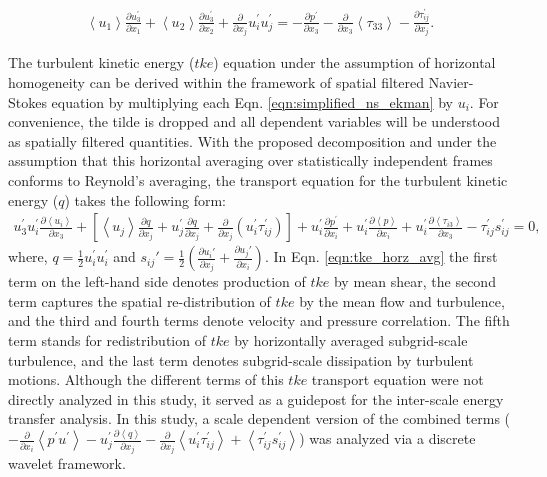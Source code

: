 \begin{align}
 \left < u_1 \right > \frac{\partial u_3^{\prime}}{\partial x_1}  + \left < u_2 \right > \frac{\partial u_3^{\prime}}{\partial x_2} +\frac{\partial }{\partial x_j} u_i^{\prime}u_j^{\prime} = -\frac{\partial p^{\prime} }{\partial x_3} -\frac{\partial }{\partial x_3} \left < \tau_{33}\right > - \frac{\partial \tau_{ij}^{\prime}}{\partial x_j}.
 \label{eqn:simplified_ns_ekman}
\end{align}

The turbulent kinetic energy ($tke$) equation under the assumption of horizontal homogeneity can be derived within the framework of spatial filtered Navier-Stokes equation by multiplying each Eqn.  \ref{eqn:simplified_ns_ekman} by $u_i$. For convenience, the tilde is dropped and all dependent variables will be understood as spatially filtered quantities. With the proposed decomposition and under the assumption that this horizontal averaging over statistically independent frames conforms to Reynold's averaging, the transport equation for the turbulent kinetic energy ($q$) takes the following form:
\begin{align}
u_3^\prime u_i^\prime \frac{\partial \left< u_i \right>}{\partial x_3}+[\left< u_j\right>\frac{\partial q}{\partial x_j}+u_j^\prime\frac{\partial q}{\partial x_j}+\frac{\partial }{\partial x_j}(u_i^\prime \tau_{ij}^\prime)]+u_i^\prime\frac{\partial p^\prime}{\partial x_i}+ u_i^\prime \frac{\partial \left < p \right >}{\partial x_i}+u_i^\prime\frac{\partial \left < \tau_{i3} \right >}{\partial x_3}-\tau_{ij}^\prime s_{ij}^\prime =0,
\label{eqn:tke_horz_avg}
\end{align}
\noindent where, $q=\frac{1}{2}u^{\prime}_i u^{\prime}_i$ and $s_{ij}'=\frac{1}{2}(\frac{\partial u_{i}'}{\partial x_j}+\frac{\partial u_{j}'}{\partial x_i})$.
In Eqn. \ref{eqn:tke_horz_avg} the first term on the left-hand side denotes production of $tke$ by mean shear, the second term captures the spatial re-distribution of $tke$ by the mean flow and turbulence, and the third and fourth terms denote velocity and pressure correlation.  The fifth term stands for redistribution of $tke$ by horizontally averaged subgrid-scale turbulence, and the last term denotes subgrid-scale dissipation by turbulent motions. Although the different terms of this $tke$ transport equation were not directly analyzed in this study, it served as a guidepost for the inter-scale energy transfer analysis. In this study, a scale dependent version of the combined terms ($-\frac{\partial }{\partial x_i}\left< p^\prime u^\prime\right>-u_j^\prime\frac{\partial \left< q\right>}{\partial x_j}-\frac{\partial}{\partial x_j}\left< u_i^\prime\tau_{ij}^\prime \right>+\left< \tau_{ij}^\prime s_{ij}^\prime\right>$) was analyzed via a discrete wavelet framework. 
